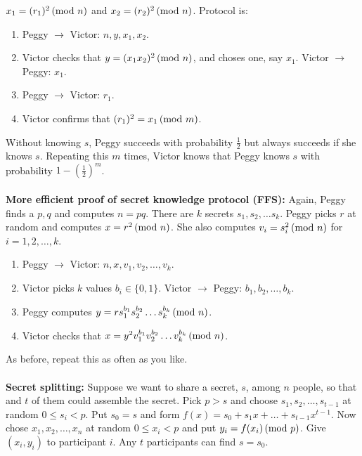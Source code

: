 $x_1 = (r_1)^2 \thinspace \textnormal{(mod } n \textnormal{)}$ and $x_2 = (r_2)^2 \thinspace \textnormal{(mod } n \textnormal{)}$.  Protocol is:
\begin{enumerate}
\item Peggy $\rightarrow$ Victor: $n, y, x_1, x_2$.
\item Victor checks that $y= (x_1 x_2)^2 \thinspace \textnormal{(mod } n \textnormal{)}$, and choses one, say $x_1$. Victor $\rightarrow$ Peggy: $x_1$.
\item Peggy $\rightarrow$ Victor: $r_1$.
\item Victor confirms that  $(r_1)^2 = x_1 \thinspace \textnormal{(mod } m \textnormal{)}$.
\end{enumerate}
Without knowing $s$, Peggy succeeds with probability ${\frac 1 2}$ but always succeeds if she knows $s$.  Repeating this
$m$ times, Victor knows that Peggy knows $s$ with probability $1-({\frac 1 2})^m$.
\\
\\
{\bf More efficient proof of secret knowledge protocol (FFS):} 
Again, Peggy finds a $p, q$ and computes $n=pq$.  There are $k$ secrets $s_1, s_2, \ldots s_k$. Peggy picks $r$ at
random and computes $x = r^2 \thinspace \textnormal{(mod } n \textnormal{)}$.  She also computes $v_i = s_i^2 \thinspace \textnormal{(mod } n \textnormal{)}$ for $i=1,2, \ldots, k$.
\begin{enumerate}
\item Peggy $\rightarrow$ Victor: $n, x, v_1, v_2 , \ldots, v_k$.
\item Victor picks $k$ values $b_i \in \{0, 1\}$.  Victor $\rightarrow$ Peggy: $b_1, b_2, \ldots, b_k$.
\item Peggy computes $y = r s_1^{b_1} s_2^{b_2} \ldots s_k^{b_k} \thinspace \textnormal{(mod } n \textnormal{)}$.
\item Victor checks that $x = y^2 v_1^{b_1} v_2^{b_2} \ldots v_k^{b_k} \thinspace \textnormal{(mod } n \textnormal{)}$.
\end{enumerate}
As before, repeat this as often as you like.
\\
\\
{\bf Secret splitting:} Suppose we want to share a secret, $s$, among $n$ people, so that and $t$ of them could assemble
the secret. Pick $p >s$ and choose $s_1, s_2, \ldots, s_{t-1}$ at random $0 \leq s_i < p$.  Put $s_0 = s$ and form
$f(x)= s_0 + s_1x + \ldots + s_{t-1}x^{t-1}$. Now chose $x_1, x_2, \ldots, x_{n}$ at random $0 \leq x_i < p$ and put
$y_i = f(x_i ) \thinspace \textnormal{(mod } p \textnormal{)}$.  Give $(x_i , y_i )$ to participant $i$.  Any $t$ participants can find $s=s_0$.
